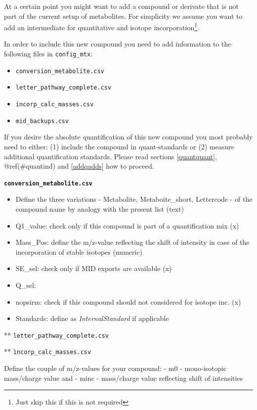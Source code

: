 \documentclass[]{book}
\providecommand{\tightlist}{%
  \setlength{\itemsep}{0pt}\setlength{\parskip}{0pt}}
\let\rmarkdownfootnote\footnote%
\def\footnote{\protect\rmarkdownfootnote}
\theoremstyle{definition}
\theoremstyle{definition}
\theoremstyle{definition}
\theoremstyle{remark}
\begin{document}
At a certain point you might want to add a compound or derivate that is
not part of the current setup of metabolites. For simplicity we assume
you want to add an intermediate for quantitative and isotope
incorporation\footnote{Just skip this if this is not required}.

In order to include this new compound you need to add information to the
following files in \texttt{config\_mtx}:

\begin{itemize}
\tightlist
\item
  \texttt{conversion\_metabolite.csv}
\item
  \texttt{letter\_pathway\_complete.csv}
\item
  \texttt{incorp\_calc\_masses.csv}
\item
  \texttt{mid\_backups.csv}
\end{itemize}

If you desire the absolute quantification of this new compound you most
probably need to either: (1) include the compound in quant-standards or
(2) measure additional quantification standards. Please read sections
\ref{quantquant}, @ref(\#quantind) and \ref{addqadds} how to proceed.

\textbf{\texttt{conversion\_metabolite.csv}}

\begin{itemize}
\tightlist
\item
  Define the three variations - Metabolite, Metaboite\_short, Lettercode
  - of the compound name by analogy with the present list (text)
\item
  Q1\_value: check only if this compound is part of a quantification mix
  (x)
\item
  Mass\_Pos: define the m/z-value reflecting the shift of intensity in
  case of the incorporation of stable isotopes (numeric)
\item
  SE\_sel: check only if MID exports are available (x)
\item
  Q\_sel:
\item
  nopsirm: check if this compound should not considered for isotope inc.
  (x)
\item
  Standards: define as \emph{InternalStandard} if applicable
\end{itemize}

** \texttt{letter\_pathway\_complete.csv}

** \texttt{ìncorp\_calc\_masses.csv}

Define the couple of m/z-values for your compound: - m0 - mono-isotopic
mass/charge value and - minc - mass/charge value reflecting shift of
intensities
\end{document}
